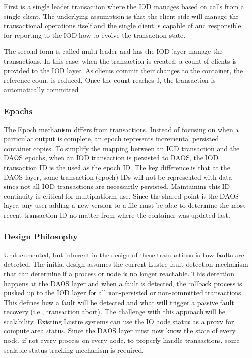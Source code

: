 \documentclass[conference]{IEEEtran} \pdfpagewidth=8.5in
\begin{document}
First is a single leader transaction where the IOD manages based on calls from
a single client. The underlying assumption is that the client side will manage
the transactional operations itself and the single client is capable of and
responsible for reporting to the IOD how to evolve the transaction state. 

The second form is called multi-leader and has the IOD layer manage the
transactions. In this case, when the transaction is created, a count of clients
is provided to the IOD layer. As clients commit their changes to the container,
the reference count is reduced. Once the count reaches 0, the transaction is
automatically committed.

\subsubsection{Epochs}

The Epoch mechanism differs from transactions. Instead of focusing on when a
particular output is complete, an epoch represents incremental persisted
container copies.  To simplify the mapping between an IOD transaction and the
DAOS epochs, when an IOD transaction is persisted to DAOS, the IOD transaction
ID is the used as the epoch ID. The key difference is that at the DAOS layer,
some transaction (epoch) IDs will not be represented with data since not all
IOD transactions are necessarily persisted. Maintaining this ID continuity is
critical for multiplatform use. Since the shared point is the DAOS layer, any
user adding a new version to a file must be able to determine the most recent
transaction ID no matter from where the container was updated last.

\subsubsection{Design Philosophy}

Undocumented, but inherent in the design of these transactions is how faults
are detected. The initial design assumes the current Lustre fault detection
mechanism that can determine if a process or node is no longer reachable. This
detection happens at the DAOS layer and when a fault is detected, the rollback
process is pushed up to the IOD layer for all non-persisted or non-committed
transactions. This defines how a fault will be detected and what will trigger a
passive fault recovery (i.e., transaction abort). The challenge with this
approach will be scalability. Existing Lustre systems can use the IO node
status as a proxy for compute area status. Since the DAOS layer must now know
the state of every node, if not every process on every node, to properly
handle transactions, some scalable status tracking mechanism is required.
\end{document}
